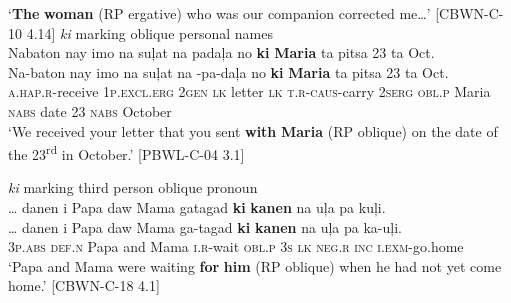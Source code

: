 \glt ‘\textbf{The} \textbf{woman} (RP ergative) who was our companion corrected me…’ [CBWN-C-10 4.14]
\z
\ea
\textit{ki} marking oblique personal names \\
Nabaton  nay  imo  na  suļat  na  padaļa no  \textbf{ki}  \textbf{Maria}  ta  pitsa  23  ta  Oct. \\\smallskip
 \gll Na-baton  nay  imo  na  suļat  na  \emptyset{}-pa-daļa no  \textbf{ki}  \textbf{Maria}  ta  pitsa  23  ta  Oct.\footnotemark{} \\
\textsc{a.hap.r}-receive  \textsc{1}\textsc{p.excl}.\textsc{erg}  2\textsc{gen}  \textsc{lk}  letter  \textsc{lk} \textsc{t.r-caus-}carry \textsc{2serg}  \textsc{obl.p}  Maria  \textsc{nabs}  date  23  \textsc{nabs}  October \\
\glt `We received your letter that you sent \textbf{with} \textbf{Maria} (RP oblique) on the date of the 23\textsuperscript{rd} in October.' [PBWL-C-04 3.1]
\z

\newpage
\ea
\textit{ki} marking third person oblique pronoun \\
… danen  i  Papa  daw  Mama  gatagad  \textbf{ki} \textbf{kanen} na  uļa  pa kuļi. \\\smallskip
 \gll … danen  i  Papa  daw  Mama  ga-tagad  \textbf{ki} \textbf{kanen} na  uļa  pa ka-uļi. \\
{} 3\textsc{p.abs}  \textsc{def.n}  Papa  and  Mama  \textsc{i.r}-wait  \textsc{obl.p}  \textsc{3s} \textsc{lk}  \textsc{neg.r} \textsc{inc} \textsc{i.exm}-go.home \\
\glt `Papa and Mama were waiting \textbf{for} \textbf{him} (RP oblique) when he had not yet come home.’ [CBWN-C-18 4.1]
\z

